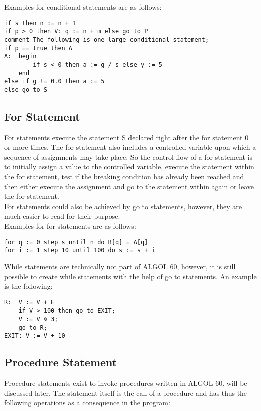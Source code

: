 \documentclass{article}
\begin{document}
Examples for conditional statements are as follows:\\ 
\begin{lstlisting}[language={[60]algol}]
if s then n := n + 1
if p > 0 then V: q := n + m else go to P
comment The following is one large conditional statement;
if p == true then A
A:  begin 
        if s < 0 then a := g / s else y := 5
    end
else if g != 0.0 then a := 5
else go to S
\end{lstlisting}

\subsection{For Statement}
For statements execute the statement S declared right after the for statement 0 or more times. The for statement also includes a controlled variable upon which a sequence of assignments may take place. So the control flow of a for statement is to initially assign a value to the controlled variable, execute the statement within the for statement, test if the breaking condition has already been reached and then either execute the assignment and go to the statement within again or leave the for statement.\\
For statements could also be achieved by go to statements, however, they are much easier to read for their purpose.\\

Examples for for statements are as follows:\\ 
\begin{lstlisting}[language={[60]algol}]
for q := 0 step s until n do B[q] = A[q]
for i := 1 step 10 until 100 do s := s + i
\end{lstlisting}

While statements are technically not part of ALGOL 60, however, it is still possible to create while statements with the help of go to statements. An example is the following:\\

\begin{lstlisting}[language={[60]algol}]
R:  V := V + E
    if V > 100 then go to EXIT;
    V := V % 3;
    go to R;
EXIT: V := V + 10
\end{lstlisting}


\subsection{Procedure Statement}
Procedure statements exist to invoke procedures written in ALGOL 60.  will be discussed later. The statement itself is the call of a procedure and has thus the following operations as a consequence in the program:
\end{document}
